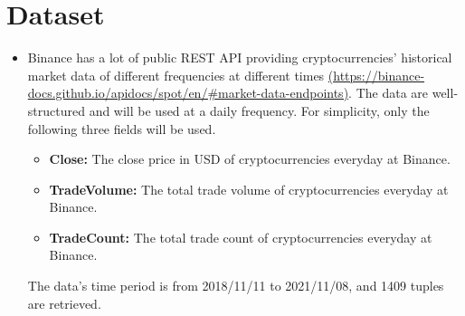 \documentclass[a4paper]{article}
\begin{document}
\section{Dataset}
\begin{itemize}
    \item Binance has a lot of public REST API providing cryptocurrencies' historical market data of different frequencies at different times \href{https://binance-docs.github.io/apidocs/spot/en/#market-d\\ata-endpoints}{(https://binance-docs.github.io/apidocs/spot/en/\#market-data-endpoints)}. The data are well-structured and will be used at a daily frequency. For simplicity, only the following three fields will be used.
    \begin{itemize}
        \item \textbf{Close:} The close price in USD of cryptocurrencies everyday at Binance.
        \item \textbf{TradeVolume:} The total trade volume of cryptocurrencies everyday at Binance.
        \item \textbf{TradeCount:} The total trade count of cryptocurrencies everyday at Binance.
    \end{itemize}
    The data's time period is from 2018/11/11 to 2021/11/08, and 1409 tuples are retrieved.


\end{itemize}
\end{document}
